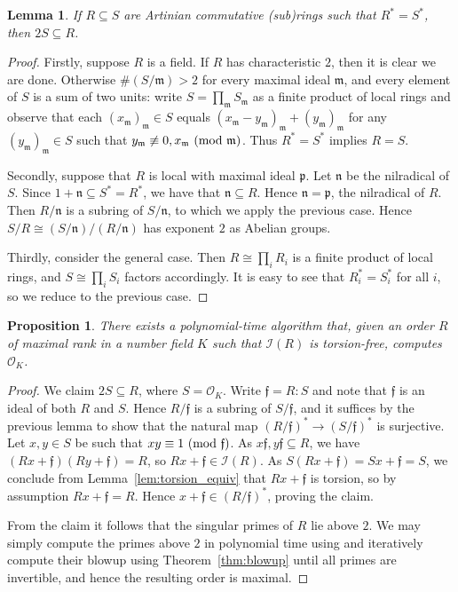 \documentclass{amsart}
\theoremstyle{plain}
\newtheorem{lemma}[theorem]{Lemma}
\newtheorem{proposition}[theorem]{Proposition}
\theoremstyle{definition}
\newcommand{\m}{\ensuremath{\mathfrak{m}}}
\newcommand{\p}{\ensuremath{\mathfrak{p}}}
\begin{document}
\begin{lemma}
If \(R\subseteq S\) are Artinian commutative (sub)rings such that \(R^*=S^*\), then \(2S\subseteq R\).
\end{lemma}
\begin{proof}
Firstly, suppose \(R\) is a field.
If \(R\) has characteristic \(2\), then it is clear we are done.
Otherwise $\#(S/\m)>2$ for every maximal ideal $\m$, and every element of \(S\) is a sum of two units: 
write $S=\prod_{\m} S_\m$ as a finite product of local rings and observe that each $(x_\m)_\m\in S$ equals $(x_\m-y_\m)_\m+(y_\m)_\m$ for any $(y_\m)_\m\in S$ such that $y_\m\not\equiv 0,x_\m\ (\textup{mod }\m)$.
Thus \(R^*=S^*\) implies \(R=S\).

Secondly, suppose that \(R\) is local with maximal ideal \(\p\).
Let \(\mathfrak{n}\) be the nilradical of \(S\). Since \(1+\mathfrak{n}\subseteq S^*=R^*\), we have that \(\mathfrak{n}\subseteq R\). Hence \(\mathfrak{n}=\p\), the nilradical of \(R\). Then \(R/\mathfrak{n}\) is a subring of \(S/\mathfrak{n}\), to which we apply the previous case. Hence \(S/R\cong(S/\mathfrak{n})/(R/\mathfrak{n})\) has exponent \(2\) as Abelian groups.

Thirdly, consider the general case. Then \(R\cong\prod_i R_i\) is a finite product of local rings, and \(S\cong \prod_i S_i\) factors accordingly. It is easy to see that \(R_i^*=S_i^*\) for all \(i\), so we reduce to the previous case.
\end{proof}

\begin{proposition}\label{prop:torsion_free_compute_OK}
There exists a polynomial-time algorithm that, given an order \(R\) of maximal rank in a number field \(K\) such that \(\mathcal{I}(R)\) is torsion-free, computes \(\mathcal{O}_K\).
\end{proposition}
\begin{proof}
We claim \(2 S\subseteq R\), where \(S=\mathcal{O}_K\).
Write \(\mathfrak{f}=R:S\) and note that \(\mathfrak{f}\) is an ideal of both \(R\) and \(S\).
Hence \(R/\mathfrak{f}\) is a subring of \(S/\mathfrak{f}\), and it suffices by the previous lemma to show that the natural map \((R/\mathfrak{f})^*\to(S/\mathfrak{f})^*\) is surjective.
Let \(x,y\in S\) be such that \(xy\equiv 1\ (\textup{mod }\mathfrak{f})\).
As \(x\mathfrak{f},y\mathfrak{f}\subseteq R\), we have \((Rx+\mathfrak{f})(Ry+\mathfrak{f})=R\), so \(Rx+\mathfrak{f}\in\mathcal{I}(R)\).
As \(S(Rx+\mathfrak{f})=Sx+\mathfrak{f}=S\), we conclude from Lemma~\ref{lem:torsion_equiv} that \(Rx+\mathfrak{f}\) is torsion, so by assumption \(Rx+\mathfrak{f}=R\).
Hence \(x+\mathfrak{f}\in (R/\mathfrak{f})^*\), proving the claim.

From the claim it follows that the singular primes of \(R\) lie above \(2\). 
We may simply compute the primes above $2$ in polynomial time using \cite{Berlekamp} and iteratively compute their blowup using Theorem~\ref{thm:blowup} until all primes are invertible, and hence the resulting order is maximal.
\end{proof}


 

\end{document}
